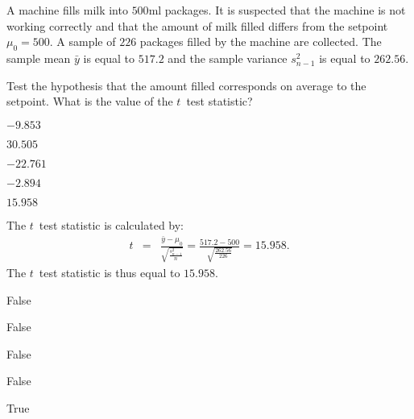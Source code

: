 
\begin{question}
A machine fills milk into $500$ml packages. It is suspected that the 
machine is not working correctly and that the amount of milk filled differs 
from the setpoint $\mu_0 = 500$. A sample of $226$ packages 
filled by the machine are collected. The sample mean $\bar{y}$ is equal to 
$517.2$ and the sample variance $s^2_{n-1}$ is equal to 
$262.56$.

Test the hypothesis that the amount filled corresponds on average to the 
setpoint. What is the value of the $t$~test statistic?

\begin{answerlist}
  \item $ -9.853$
  \item $ 30.505$
  \item $-22.761$
  \item $ -2.894$
  \item $ 15.958$
\end{answerlist}
\end{question}

\begin{solution}
The $t$~test statistic is calculated by:
\begin{eqnarray*}
  t & = & \frac{\bar y - \mu_0}{\sqrt{\frac{s^2_{n-1}}{n}}}
  = \frac{517.2 - 500}{\sqrt{\frac{262.56}{226}}}
  = 15.958.
\end{eqnarray*}
The $t$~test statistic is thus equal to
$15.958$.

\begin{answerlist}
  \item False
  \item False
  \item False
  \item False
  \item True
\end{answerlist}
\end{solution}

